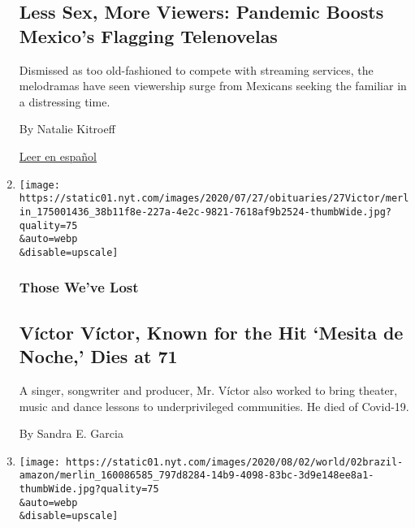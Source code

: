 \begin{enumerate}
  \hypertarget{less-sex-more-viewers-pandemic-boosts-mexicos-flagging-telenovelas}{%
  \subsection{Less Sex, More Viewers: Pandemic Boosts Mexico's Flagging
  Telenovelas}\label{less-sex-more-viewers-pandemic-boosts-mexicos-flagging-telenovelas}}

  Dismissed as too old-fashioned to compete with streaming services, the
  melodramas have seen viewership surge from Mexicans seeking the
  familiar in a distressing time.

  By Natalie Kitroeff

  \href{https://www.nytimes.com/es/2020/08/02/espanol/america-latina/televisa-rosa-de-guadalupe-netflix.html}{Leer
  en español}
\item
  \href{/2020/08/01/obituaries/victor-victor-dead-coronavirus.html}{}

  \texttt{[image: https://static01.nyt.com/images/2020/07/27/obituaries/27Victor/merlin\_175001436\_38b11f8e-227a-4e2c-9821-7618af9b2524-thumbWide.jpg?quality=75\\\&auto=webp\\\&disable=upscale]}

  \hypertarget{those-weve-lost}{%
  \subsubsection{Those We've Lost}\label{those-weve-lost}}

  \hypertarget{vuxedctor-vuxedctor-known-for-the-hit-mesita-de-noche-dies-at-71}{%
  \subsection{Víctor Víctor, Known for the Hit `Mesita de Noche,' Dies
  at
  71}\label{vuxedctor-vuxedctor-known-for-the-hit-mesita-de-noche-dies-at-71}}

  A singer, songwriter and producer, Mr. Víctor also worked to bring
  theater, music and dance lessons to underprivileged communities. He
  died of Covid-19.

  By Sandra E. Garcia
\item
  \href{/2020/08/01/world/americas/Brazil-amazon-deforestation-bolsonaro.html}{}

  \texttt{[image: https://static01.nyt.com/images/2020/08/02/world/02brazil-amazon/merlin\_160086585\_797d8284-14b9-4098-83bc-3d9e148ee8a1-thumbWide.jpg?quality=75\\\&auto=webp\\\&disable=upscale]}

  \hypertarget{under-pressure-brazils-bolsonaro-forced-to-fight-deforestation}{%
}
\end{enumerate}
